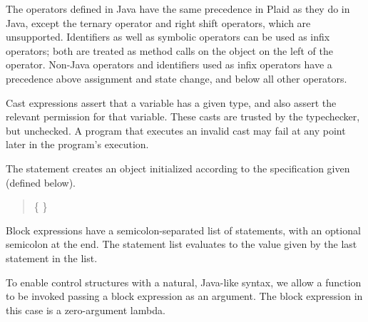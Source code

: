 The operators defined in Java have the same precedence in Plaid as
they do in Java, except the ternary operator and right shift operators, 
which are unsupported.  Identifiers as well as symbolic operators can be
used as infix operators; both are treated as method calls on the
object on the left of the operator.  Non-Java operators and
identifiers used as infix operators have a precedence above assignment
and state change, and below all other operators.

Cast expressions assert that a variable has a given type, and
also assert the relevant permission for that variable.  These casts
are trusted by the typechecker, but unchecked. A program that executes 
an invalid cast may fail at any point later in the program's 
execution.

\begin{quote}


 {}

 {} 

 {}

\end{quote}

The  statement creates an object initialized according to the
 specification given (defined below).

\begin{quote}


 \{  \}


 {}  \opt{;}

\end{quote}

Block expressions have a semicolon-separated list of statements, with
an optional semicolon at the end.  The statement list evaluates to the
value given by the last statement in the list.

\begin{quote}


 {}

 {} 

\end{quote}

To enable control structures with a natural, Java-like syntax, we allow
a function to be invoked passing a block expression as an argument.  The
block expression in this case is a zero-argument lambda.

